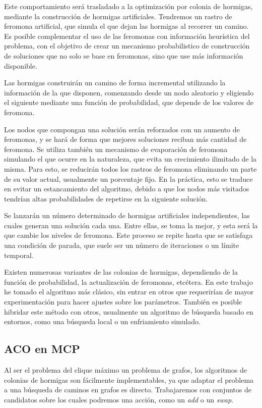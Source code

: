 Este comportamiento será trasladado a la optimización por colonia de hormigas,
mediante la construcción de hormigas artificiales. Tendremos un rastro de feromona
artificial, que simula el que dejan las hormigas al recorrer un camino. Es posible
complementar el uso de las feromonas con información heurística del problema,
con el objetivo de crear un mecanismo probabilistico de construcción de soluciones
que no solo se base en feromonas, sino que use más información disponible.

Las hormigas construirán un camino de forma incremental utilizando la información
de la que disponen, comenzando desde un nodo aleatorio y eligiendo el siguiente
mediante una función de probabilidad, que depende de los valores de feromona.

Los nodos que compongan una solución serán reforzados con un aumento de feromonas, y
se hará de forma que mejores soluciones reciban más cantidad de feromona.
Se utiliza también un mecanismo de evaporación de feromona simulando el que ocurre en
la naturaleza, que evita un crecimiento ilimitado de la misma. Para esto, se reducirán
todos los rastros de feromona eliminando un parte de su valor actual, usualmente un
porcentaje fijo. En la práctica, esto se traduce en evitar un estancamiento del algoritmo,
debido a que los nodos más visitados tendrían altas probabilidades de repetirse en la
siguiente solución.

Se lanzarán un número determinado de hormigas artificiales independientes, las
cuales generan una solución cada una. Entre ellas, se toma la mejor, y esta será la
que cambie los niveles de feromona. Este proceso se repite hasta que se satisfaga una
condición de parada, que suele ser un número de iteraciones o un límite temporal.

Existen numerosas variantes de las colonias de hormigas, dependiendo de la función de
probabilidad, la actualización de feromonas, etcétera. En este trabajo he tomado el
algoritmo más clásico, sin entrar en otros que requerirían de mayor experimentación
para hacer ajustes sobre los parámetros. También es posible hibridar este método
con otros, usualmente un algoritmo de búsqueda basado en entornos, como una búsqueda
local o un enfriamiento simulado.

\subsection{ACO en MCP}

Al ser el problema del clique máximo un problema de grafos, los algoritmos de colonias
de hormigas son fácilmente implementables, ya que adaptar el problema a una búsqueda
de caminos en grafos es directo. Trabajaremos con conjuntos de candidatos sobre los
cuales podremos una acción, como un \textit{add} o un \textit{swap}.

